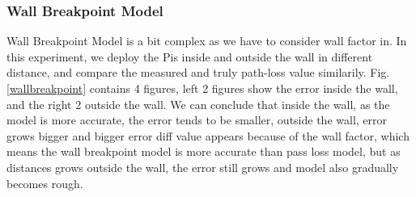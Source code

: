 \documentclass[10pt,conference]{IEEEtran}
\begin{document}
\subsubsection{Wall Breakpoint Model}
Wall Breakpoint Model is a bit complex as we have to consider wall factor in. In this experiment, we deploy the Pis inside and outside the wall in different distance, and compare the measured and truly path-loss value similarily. Fig. \ref{wallbreakpoint} contains 4 figures, left 2 figures show the error inside the wall, and the right 2 outside the wall. We can conclude that inside the wall, as the model is more accurate, the error tends to be smaller, outside the wall, error grows bigger and bigger error diff value appears because of the wall factor, which means the wall breakpoint model is more accurate than pass loss model, but as distances grows outside the wall, the error still grows and model also gradually becomes rough.
\end{document}

